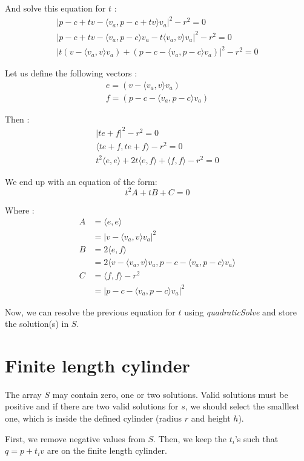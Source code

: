 \documentclass{article}
\begin{document}
And solve this equation for $t$ :
\begin{gather*}
    |p-c+tv-\langle v_a, p-c+tv\rangle v_a|^2-r^2=0\\
    |p-c+tv - \langle v_a, p-c\rangle v_a - t\langle v_a, v\rangle v_a|^2 -r^2=0\\
    |t(v-\langle v_a, v\rangle v_a) + (p-c- \langle v_a, p-c\rangle v_a)|^2 -r^2 = 0
\end{gather*}

Let us define the following vectors :
\begin{gather*}
    e = (v-\langle v_a, v\rangle v_a)\\
    f = (p-c- \langle v_a, p-c\rangle v_a)
\end{gather*}

Then :
\begin{gather*}
    |te + f|^2 -r^2 = 0\\
    \langle te+f, te+f\rangle  -r^2 = 0\\
    t^2  \langle e,e\rangle  + 2t\langle e, f\rangle  + \langle f,f\rangle  -r^2 = 0
\end{gather*}

We end up with an equation of the form:
$$t^2A + tB + C = 0$$

Where :
\begin{align*}
    A &= \langle e,e\rangle  \\
    &= |v-\langle v_a, v\rangle v_a|^2\\
    B &= 2\langle e, f\rangle  \\
    &= 2\langle v-\langle v_a, v\rangle v_a, p-c- \langle v_a, p-c\rangle v_a\rangle \\
    C &= \langle f,f\rangle  -r^2 \\
    &= |p-c- \langle v_a, p-c\rangle v_a|^2
\end{align*}


Now, we can resolve the previous equation for $t$ using \textit{quadraticSolve} and store the solution(s) in $S$.

\section{Finite length cylinder}
The array $S$ may contain zero, one or two solutions. Valid solutions must be positive and if there are two valid solutions for $s$, we should select the smalllest one, which is inside the defined cylinder (radius $r$ and height $h$).

First, we remove negative values from $S$. Then, we keep the $t_i$'s such that $q = p+t_iv$ are on the finite length cylinder.
\end{document}
